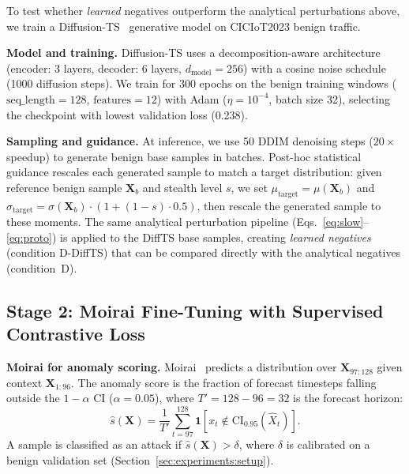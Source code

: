 To test whether \emph{learned} negatives outperform the analytical
perturbations above, we train a Diffusion-TS~\cite{zhang2024diffusionts}
generative model on CICIoT2023 benign traffic.

\textbf{Model and training.}
Diffusion-TS uses a decomposition-aware architecture
(encoder: 3 layers, decoder: 6 layers, $d_{\text{model}}{=}256$)
with a cosine noise schedule (1000 diffusion steps).
We train for 300 epochs on the benign training windows
($\text{seq\_length}{=}128$, $\text{features}{=}12$) with Adam
($\eta{=}10^{-4}$, batch size 32), selecting the checkpoint with
lowest validation loss (0.238).

\textbf{Sampling and guidance.}
At inference, we use 50 DDIM denoising steps ($20\times$ speedup)
to generate benign base samples in batches.
Post-hoc statistical guidance rescales each generated sample to match
a target distribution: given reference benign sample $\mathbf{X}_b$
and stealth level $s$, we set
$\mu_{\text{target}} = \mu(\mathbf{X}_b)$ and
$\sigma_{\text{target}} = \sigma(\mathbf{X}_b) \cdot (1 + (1{-}s) \cdot 0.5)$,
then rescale the generated sample to these moments.
The same analytical perturbation pipeline
(Eqs.~\ref{eq:slow}--\ref{eq:proto}) is applied to the DiffTS
base samples, creating \emph{learned negatives} (condition D-DiffTS)
that can be compared directly with the analytical negatives
(condition~D).

\subsection{Stage 2: Moirai Fine-Tuning with Supervised Contrastive Loss}
\label{sec:method:finetune}

\textbf{Moirai for anomaly scoring.}
Moirai~\cite{woo2024moirai} predicts a distribution over
$\mathbf{X}_{97:128}$ given context $\mathbf{X}_{1:96}$.
The anomaly score is the fraction of forecast timesteps falling outside the
$1{-}\alpha$ CI ($\alpha{=}0.05$), where $T' = 128 - 96 = 32$ is the
forecast horizon:
\begin{equation}
  \hat{s}(\mathbf{X}) = \frac{1}{T'}\sum_{t=97}^{128}
    \mathbf{1}\!\left[x_t \notin \text{CI}_{0.95}(\hat{X}_t)\right].
\end{equation}
A sample is classified as an attack if $\hat{s}(\mathbf{X}) > \delta$,
where $\delta$ is calibrated on a benign validation set
(Section~\ref{sec:experiments:setup}).

